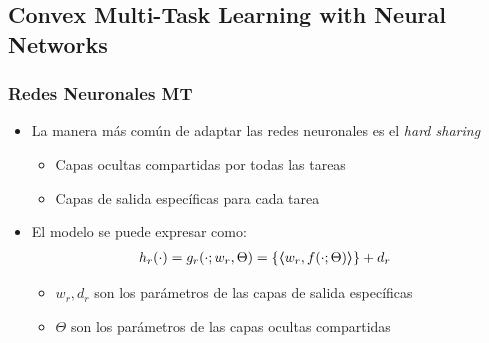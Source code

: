 \documentclass[aspectratio=43]{beamer}
\newcommand{\dotp}[2]{\bm{\left\langle} #1, #2 \bm{\right\rangle}}
\begin{document}
\subsection{Convex Multi-Task Learning with Neural Networks}
\begin{frame}
      \frametitle{Redes Neuronales MT}

      \begin{itemize}
            \item La manera más común de adaptar las redes neuronales es el \emph{hard sharing}
            \begin{itemize}
                  \item Capas ocultas compartidas por todas las tareas
                  \item Capas de salida específicas para cada tarea
            \end{itemize}
            \item El modelo se puede expresar como:
            \begin{equation}
                  \nonumber
                  \begin{aligned}
                      h_r(\cdot) &=  g_r(\cdot; w_r, \Theta)
                     =  \lbrace \dotp{w_r}{f(\cdot; \Theta)} \rbrace + d_r
                  \end{aligned}
            \end{equation}
            \begin{itemize}
                  \item $w_r, d_r$ son los parámetros de las capas de salida específicas
                  \item $\Theta$ son los parámetros de las capas ocultas compartidas
            \end{itemize}
      \end{itemize}

\end{frame}

\begin{frame}

      

\end{frame}
\end{document}
